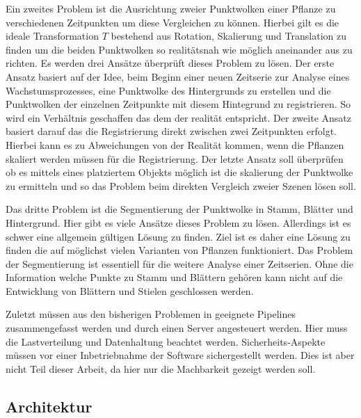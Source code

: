 \documentclass[12pt,titlepage,twoside]{article}
\begin{document}
Ein zweites Problem ist die Ausrichtung zweier Punktwolken einer Pflanze zu verschiedenen Zeitpunkten um diese Vergleichen zu können. 
Hierbei gilt es die ideale Transformation $T$ bestehend aus Rotation, Skalierung und Translation zu finden um die beiden Punktwolken so realitätsnah wie möglich aneinander aus zu richten.
Es werden drei Ansätze überprüft dieses Problem zu lösen. 
Der erste Ansatz basiert auf der Idee, beim Beginn einer neuen Zeitserie zur Analyse eines Wachstumsprozesses, eine Punktwolke des Hintergrunds zu erstellen und die Punktwolken der einzelnen Zeitpunkte mit diesem Hintegrund zu registrieren. So wird ein Verhältnis geschaffen das dem der realität entspricht.
Der zweite Ansatz basiert darauf das die Registrierung direkt zwischen zwei Zeitpunkten erfolgt. Hierbei kann es zu Abweichungen von der Realität kommen, wenn die Pflanzen skaliert werden müssen für die Registrierung.
Der letzte Ansatz soll überprüfen ob es mittels eines platziertem Objekts möglich ist die skalierung der Punktwolke zu ermitteln und so das Problem beim direkten Vergleich zweier Szenen lösen soll.

Das dritte Problem ist die Segmentierung der Punktwolke in Stamm, Blätter und Hintergrund. Hier gibt es viele Ansätze dieses Problem zu lösen. Allerdings ist es schwer eine allgemein gültigen Lösung zu finden. 
Ziel ist es daher eine Lösung zu finden die auf möglichst vielen Varianten von Pflanzen funktioniert. 
Das Problem der Segmentierung ist essentiell für die weitere Analyse einer Zeitserien. Ohne die Information welche Punkte zu Stamm und Blättern gehören kann nicht auf die Entwicklung von Blättern und Stielen geschlossen werden.

Zuletzt müssen aus den bisherigen Problemen in geeignete Pipelines zusammengefasst werden und durch einen Server angesteuert werden. Hier muss die Lastverteilung und Datenhaltung beachtet werden. 
Sicherheits-Aspekte müssen vor einer Inbetriebnahme der Software sichergestellt werden. Dies ist aber nicht Teil dieser Arbeit, da hier nur die Machbarkeit gezeigt werden soll.

\subsection{Architektur}
\label{sec:realisierung:architektur}
\end{document}
